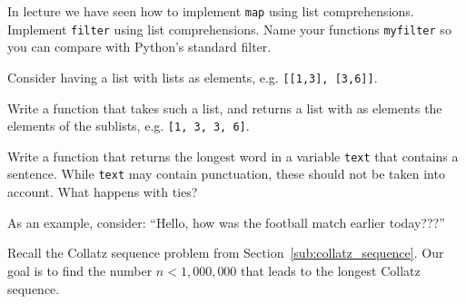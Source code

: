 \begin{questions}


\label{sub:filter}

In lecture we have seen how to implement \texttt{map} using list comprehensions.
Implement \texttt{filter} using list comprehensions.
Name your functions \texttt{myfilter} so you can compare with Python's standard filter.

\label{sub:flatten_a_list_of_lists}

Consider having a list with lists as elements, e.g.
\texttt{[[1,3], [3,6]]}.

Write a function that takes such a list, and returns a list with as elements the
elements of the sublists, e.g. \texttt{[1, 3, 3, 6]}.


\label{sub:finding_longest_word}

Write a function that returns the longest word in a variable \texttt{text}
that contains a sentence.
While \texttt{text} may contain punctuation, these should not be taken into account.
What happens with ties?

As an example, consider: ``Hello, how was the football match earlier today???''


\label{sub:collatz_sequence_part_2}

Recall the Collatz sequence problem from Section~\ref{sub:collatz_sequence}.
Our goal is to find the number $n < 1,000,000$ that leads to the longest Collatz sequence.

\end{questions}
